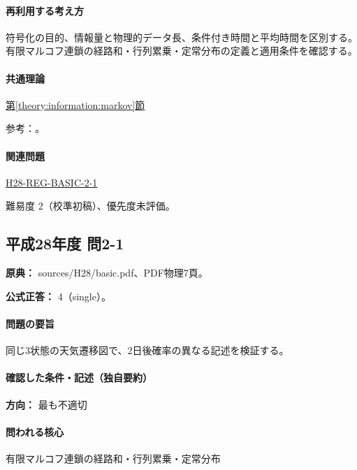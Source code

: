 \paragraph{再利用する考え方} 符号化の目的、情報量と物理的データ長、条件付き時間と平均時間を区別する。有限マルコフ連鎖の経路和・行列累乗・定常分布の定義と適用条件を確認する。

\paragraph{共通理論} \hyperref[theory:information:markov]{第\ref*{theory:information:markov}節}

\par 参考：\cite{info_markov}。

\paragraph{関連問題} \hyperref[q:h28-reg-basic-2-1]{H28-REG-BASIC-2-1}

\par 難易度 2（校準初稿）、優先度未評価。

\subsection{平成28年度 問2-1}
\label{q:h28-reg-basic-2-1}

\noindent\textbf{原典：} sources/H28/basic.pdf、PDF物理7頁。

\textbf{公式正答：} 4（single）。

\paragraph{問題の要旨} 同じ3状態の天気遷移図で、2日後確率の異なる記述を検証する。

\paragraph{確認した条件・記述（独自要約）}\mbox{}\par

\noindent\textbf{方向：} 最も不適切\par

\paragraph{問われる核心} 有限マルコフ連鎖の経路和・行列累乗・定常分布

